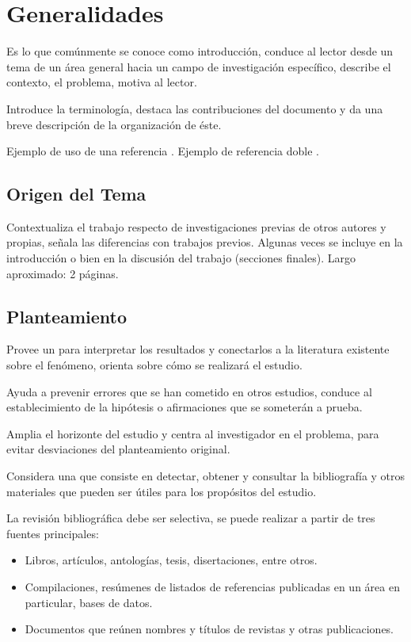 \chapter{Generalidades}

Es lo que comúnmente se conoce como introducción, conduce al lector desde un tema de un área general hacia un campo de investigación específico, describe el contexto, el problema, motiva al lector.

Introduce la terminología, destaca las contribuciones del documento y da una breve descripción de la organización de éste.

Ejemplo de uso de una referencia \cite{SN01}. Ejemplo de referencia doble \cite{ABC02,JanChomicki2008}.


\section{Origen del Tema}
Contextualiza el trabajo respecto de investigaciones previas de otros autores y propias, señala las diferencias con trabajos previos. Algunas veces se incluye en la introducción o bien en la discusión del trabajo (secciones finales). Largo aproximado: 2 páginas.
\section{Planteamiento}

Provee un  para interpretar los resultados y conectarlos a la literatura existente sobre el fenómeno, orienta sobre cómo se realizará el estudio.

 Ayuda a prevenir errores que se han cometido en otros estudios, conduce al establecimiento de la hipótesis o afirmaciones que se someterán a prueba.
 
 Amplia el horizonte del estudio y centra al investigador en el problema, para evitar desviaciones del planteamiento original.

Considera una  que consiste en detectar, obtener y consultar la bibliografía y otros materiales que pueden ser útiles para los propósitos del estudio.

La revisión bibliográfica debe ser selectiva, se puede realizar a partir de tres fuentes principales:

\begin{itemize}\justifying
  \item {} Libros, artículos, antologías, tesis, disertaciones, entre otros.
  \item {} Compilaciones, resúmenes de listados de referencias publicadas en un área en particular, bases de datos.
  \item {} Documentos que reúnen nombres y títulos de revistas y otras publicaciones.
\end{itemize}



